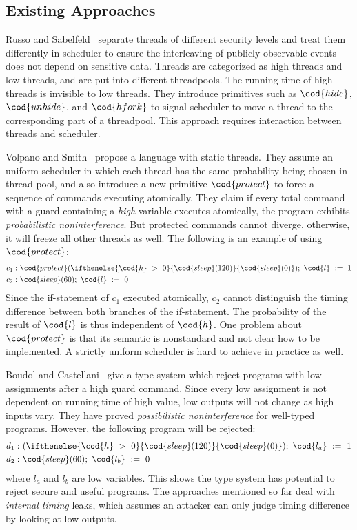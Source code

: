 \subsection{Existing Approaches}
Russo and Sabelfeld~\cite{Russo:Sabelfeld:CSFW06} separate threads of 
different security levels and treat them differently in scheduler 
to ensure the interleaving of publicly-observable events does not 
depend on sensitive data. Threads are categorized as high threads 
and low threads, and are put into different threadpools. The running time 
of high threads is invisible to low threads. They introduce primitives such 
as $\cod{hide}$, $\cod{unhide}$, and $\cod{hfork}$ to signal scheduler 
to move a thread to the corresponding part of a threadpool. This
approach requires interaction between threads and scheduler.

Volpano and Smith~\cite{Volpano:Smith:Probabilistic} propose a language
with static threads. They assume an uniform scheduler in which
each thread has the same probability being chosen in thread pool, and also
introduce a new primitive $\cod{protect}$ to force a sequence of commands
executing atomically. They claim if every total command with a guard containing
a {\it high} variable executes atomically, the program exhibits {\em probabilistic
noninterference}. But protected commands cannot diverge, otherwise, it will
freeze all other threads as well. The following is an example of using $\cod{protect}$:
\begin{align*}
c_1:&~\cod{protect}(\ifthenelse{\cod{h}~>~0}{\cod{sleep}(120)}{\cod{sleep}(0)});~\cod{l}~:=~1 \\
c_2:&~\cod{sleep}(60);~\cod{l}~:=~0
\end{align*}
Since the if-statement of $c_1$ executed atomically, $c_2$ cannot
distinguish the timing difference between both branches of the if-statement.
The probability of the result of $\cod{l}$ is thus independent of $\cod{h}$.
One problem about $\cod{protect}$ is that its semantic is nonstandard and
not clear how to be implemented. A strictly uniform scheduler is hard to 
achieve in practice as well.

Boudol and Castellani~\cite{Castellani:Boudol:TCS02} give a type system which 
reject programs with low assignments after a high guard command. Since every
low assignment is not dependent on running time of high value, low outputs 
will not change as high inputs vary. They have proved {\em possibilistic 
noninterference} for well-typed programs. However, the following program
will be rejected:
\begin{align*}
d_1:&~(\ifthenelse{\cod{h}~>~0}{\cod{sleep}(120)}{\cod{sleep}(0)});~\cod{l_a}~:=~1 \\
d_2:&~\cod{sleep}(60);~\cod{l_b}~:=~0
\end{align*}
where $l_a$ and $l_b$ are low variables.
This shows the type system has potential to reject secure and useful programs.
The approaches mentioned so far deal with {\em internal timing} leaks, which
assumes an attacker can only judge timing difference by looking at
low outputs.

